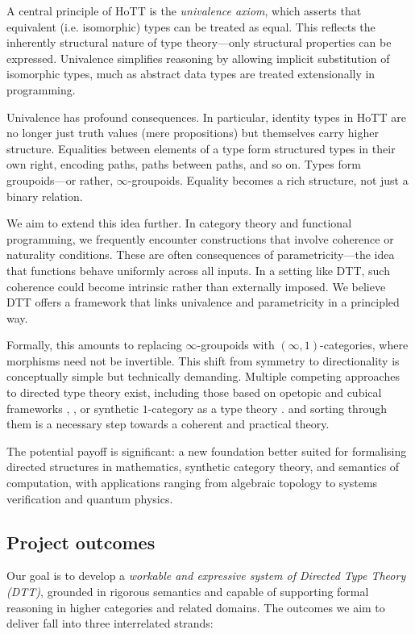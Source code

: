 \documentclass[a4paper,11pt]{article}
\begin{document}
A central principle of HoTT is the \emph{univalence axiom}, which asserts
that equivalent (i.e. isomorphic) types can be treated as equal. This
reflects the inherently structural nature of type theory—only
structural
properties can be expressed. Univalence
simplifies reasoning by allowing implicit substitution of isomorphic
types, much as abstract data types are treated extensionally in
programming.

Univalence has profound consequences. In particular, identity types in
HoTT are no longer just truth values (mere propositions) but
themselves carry higher structure. Equalities between elements of a
type form structured types in their own right, encoding paths, paths
between paths, and so on. Types form groupoids—or rather,
$\infty$-groupoids. Equality becomes a rich structure, not just a
binary relation.

We aim to extend this idea further. In category theory and functional
programming, we frequently encounter constructions that involve
coherence or naturality conditions. These are often consequences of
parametricity—the idea that functions behave uniformly across all
inputs. In a setting like DTT, such coherence could become intrinsic
rather than externally imposed. We believe DTT offers a framework that
links univalence and parametricity in a principled way.

Formally, this amounts to replacing $\infty$-groupoids with
$(\infty,1)$-categories, where morphisms need not be invertible. This
shift from symmetry to directionality is conceptually simple but
technically demanding. Multiple competing approaches to directed type
theory exist, including those based on opetopic and cubical frameworks
\cite{riehlshulman2017}, \cite{licata2016}, or synthetic
$1$-category as a type theory \cite{licata:2011,north_2019,altenkirch_neumann_2024}.
and sorting through them is a necessary step towards a coherent and practical theory.

The potential payoff is significant: a new foundation better suited
for formalising directed structures in mathematics, synthetic category
theory, and semantics of computation, with applications ranging from
algebraic topology to systems verification and quantum physics.

\subsection{Project outcomes}\label{project-outcomes}

Our goal is to develop a \emph{workable and expressive system of Directed Type Theory (DTT)}, grounded in rigorous semantics and capable of supporting formal reasoning in higher categories and related domains. The outcomes we aim to deliver fall into three interrelated strands:
\end{document}
